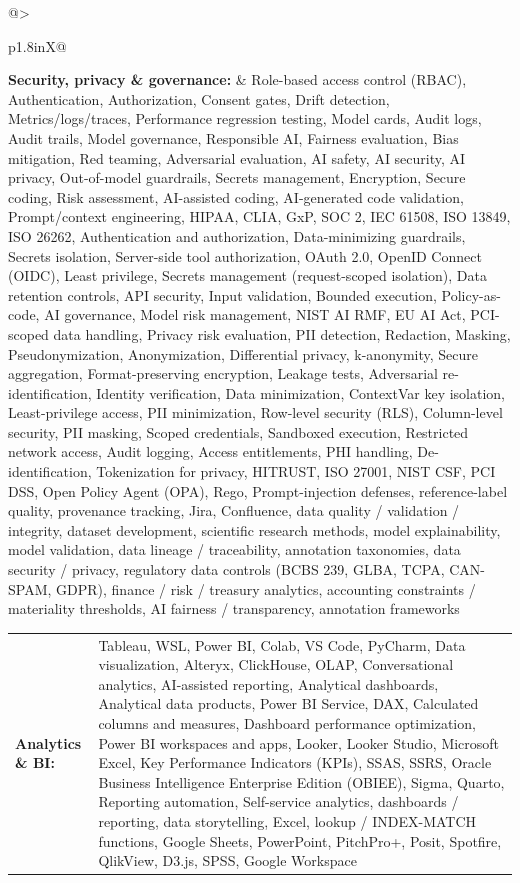 \documentclass[letterpaper,11pt]{article}
\begin{document}
\begin{tabularx}{\linewidth}{@{}>{\raggedright\arraybackslash}p{1.8in}X@{}}
\textbf{Security, privacy \& governance:} & \footnotesize{Role-based access control (RBAC), Authentication, Authorization, Consent gates, Drift detection, Metrics/logs/traces, Performance regression testing, Model cards, Audit logs, Audit trails, Model governance, Responsible AI, Fairness evaluation, Bias mitigation, Red teaming, Adversarial evaluation, AI safety, AI security, AI privacy, Out-of-model guardrails, Secrets management, Encryption, Secure coding, Risk assessment, AI-assisted coding, AI-generated code validation, Prompt/context engineering, HIPAA, CLIA, GxP, SOC 2, IEC 61508, ISO 13849, ISO 26262, Authentication and authorization, Data-minimizing guardrails, Secrets isolation, Server-side tool authorization, OAuth 2.0, OpenID Connect (OIDC), Least privilege, Secrets management (request-scoped isolation), Data retention controls, API security, Input validation, Bounded execution, Policy-as-code, AI governance, Model risk management, NIST AI RMF, EU AI Act, PCI-scoped data handling, Privacy risk evaluation, PII detection, Redaction, Masking, Pseudonymization, Anonymization, Differential privacy, k-anonymity, Secure aggregation, Format-preserving encryption, Leakage tests, Adversarial re-identification, Identity verification, Data minimization, ContextVar key isolation, Least-privilege access, PII minimization, Row-level security (RLS), Column-level security, PII masking, Scoped credentials, Sandboxed execution, Restricted network access, Audit logging, Access entitlements, PHI handling, De-identification, Tokenization for privacy, HITRUST, ISO 27001, NIST CSF, PCI DSS, Open Policy Agent (OPA), Rego, Prompt-injection defenses, reference-label quality, provenance tracking, Jira, Confluence, data quality / validation / integrity, dataset development, scientific research methods, model explainability, model validation, data lineage / traceability, annotation taxonomies, data security / privacy, regulatory data controls (BCBS 239, GLBA, TCPA, CAN-SPAM, GDPR), finance / risk / treasury analytics, accounting constraints / materiality thresholds, AI fairness / transparency, annotation frameworks}\\
\end{tabularx}
\par\vspace{2pt}
\begin{tabularx}{\linewidth}{@{}>{\raggedright\arraybackslash}p{1.8in}X@{}}
\textbf{Analytics \& BI:} & \footnotesize{Tableau, WSL, Power BI, Colab, VS Code, PyCharm, Data visualization, Alteryx, ClickHouse, OLAP, Conversational analytics, AI-assisted reporting, Analytical dashboards, Analytical data products, Power BI Service, DAX, Calculated columns and measures, Dashboard performance optimization, Power BI workspaces and apps, Looker, Looker Studio, Microsoft Excel, Key Performance Indicators (KPIs), SSAS, SSRS, Oracle Business Intelligence Enterprise Edition (OBIEE), Sigma, Quarto, Reporting automation, Self-service analytics, dashboards / reporting, data storytelling, Excel, lookup / INDEX-MATCH functions, Google Sheets, PowerPoint, PitchPro+, Posit, Spotfire, QlikView, D3.js, SPSS, Google Workspace}\\
\end{tabularx}
\end{document}
